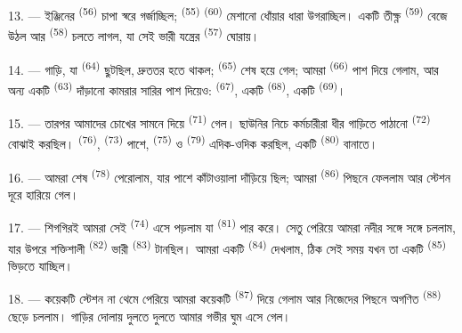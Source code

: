 13. --- ইঞ্জিনের  \textsuperscript{(56)} চাপা স্বরে গর্জাচ্ছিল;
 \textsuperscript{(55)}  \textsuperscript{(60)} মেশানো
ধোঁয়ার ধারা উগরাচ্ছিল। একটি তীক্ষ্ণ  \textsuperscript{(59)} বেজে
উঠল আর  \textsuperscript{(58)} চলতে লাগল, যা সেই ভারী যন্ত্রের
 \textsuperscript{(57)} ঘোরায়।

\VUsaut{3.0mm}
\VUsaut{3.0mm}

14. --- গাড়ি, যা  \textsuperscript{(64)} ছুটছিল, দ্রুততর হতে
থাকল;  \textsuperscript{(65)} শেষ হয়ে গেল; আমরা
 \textsuperscript{(66)} পাশ দিয়ে গেলাম, আর অন্য একটি
 \textsuperscript{(63)} দাঁড়ানো কামরার সারির পাশ দিয়েও:
 \textsuperscript{(67)}, একটি 
\textsuperscript{(68)}, একটি  \textsuperscript{(69)}।


15. --- তারপর আমাদের চোখের সামনে দিয়ে 
\textsuperscript{(71)} গেল। ছাউনির নিচে কর্মচারীরা ধীর গাড়িতে পাঠানো
 \textsuperscript{(72)} বোঝাই করছিল। 
\textsuperscript{(76)},  \textsuperscript{(73)} পাশে,
 \textsuperscript{(75)} ও 
\textsuperscript{(79)} এদিক-ওদিক করছিল, একটি 
\textsuperscript{(80)} বানাতে।

16. --- আমরা শেষ  \textsuperscript{(78)} পেরোলাম, যার পাশে
কাঁটাওয়ালা দাঁড়িয়ে ছিল; আমরা  \textsuperscript{(86)}
পিছনে ফেললাম আর স্টেশন দূরে হারিয়ে গেল।

17. --- শিগগিরই আমরা সেই  \textsuperscript{(74)} এসে
পড়লাম যা  \textsuperscript{(81)} পার করে। সেতু পেরিয়ে আমরা নদীর
সঙ্গে সঙ্গে চললাম, যার উপরে শক্তিশালী  \textsuperscript{(82)}
ভারী  \textsuperscript{(83)} টানছিল। আমরা একটি
 \textsuperscript{(84)} দেখলাম, ঠিক সেই সময় যখন তা একটি
 \textsuperscript{(85)} ভিড়তে যাচ্ছিল।

18. --- কয়েকটি স্টেশন না থেমে পেরিয়ে আমরা কয়েকটি 
\textsuperscript{(87)} দিয়ে গেলাম আর নিজেদের পিছনে 
অগণিত  \textsuperscript{(88)} ছেড়ে চললাম। গাড়ির দোলায় দুলতে
দুলতে আমার গভীর ঘুম এসে গেল।

